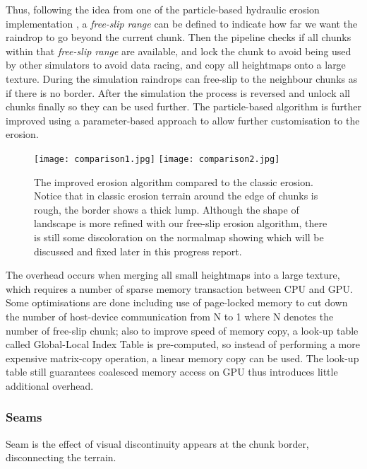 \documentclass[oneside, a4paper]{article}
\begin{document}
    Thus, following the idea from one of the particle-based hydraulic erosion implementation \cite{cell_based_erosion}, a \textit{free-slip range} can be defined to indicate how far we want the raindrop to go beyond the current chunk. Then the pipeline checks if all chunks within that \textit{free-slip range} are available, and lock the chunk to avoid being used by other simulators to avoid data racing, and copy all heightmaps onto a large texture. During the simulation raindrops can free-slip to the neighbour chunks as if there is no border. After the simulation the process is reversed and unlock all chunks finally so they can be used further. The particle-based algorithm is further improved using a parameter-based approach \cite{parameter_particle_based} to allow further customisation to the erosion.

    \begin{figure}[H]
        \center
        \texttt{[image: comparison1.jpg]}
        \texttt{[image: comparison2.jpg]}
        \caption{The improved erosion algorithm compared to the classic erosion. Notice that in classic erosion terrain around the edge of chunks is rough, the border shows a thick lump. Although the shape of landscape is more refined with our free-slip erosion algorithm, there is still some discoloration on the normalmap showing which will be discussed and fixed later in this progress report.}
    \end{figure}

    The overhead occurs when merging all small heightmaps into a large texture, which requires a number of sparse memory transaction between CPU and GPU. Some optimisations are done including use of page-locked memory to cut down the number of host-device communication from N to 1 where N denotes the number of free-slip chunk; also to improve speed of memory copy, a look-up table called Global-Local Index Table is pre-computed, so instead of performing a more expensive matrix-copy operation, a linear memory copy can be used. The look-up table still guarantees coalesced memory access on GPU thus introduces little additional overhead.

    \subsubsection{Seams}

    Seam is the effect of visual discontinuity appears at the chunk border, disconnecting the terrain.
\end{document}

